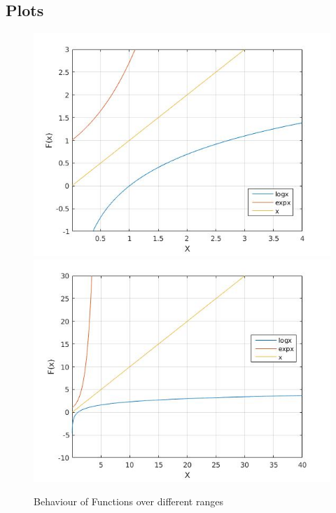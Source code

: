 \documentclass{article}
\begin{document}
\subsection{Plots}

\begin{figure}[!h]
    \centering
    \includegraphics[scale = 0.4]{2}
    \includegraphics[scale = 0.4]{3}
    \caption{Behaviour of Functions over different ranges}
    \label{fig:ques1}
\end{figure}
\end{document}
